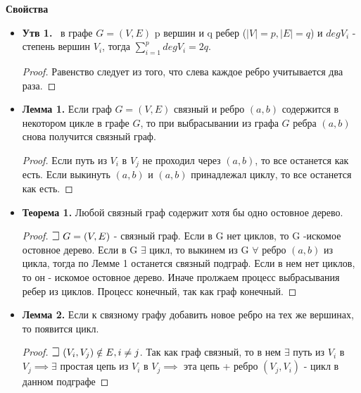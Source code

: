 \noindent\textbf{Свойства}
\begin{itemize}
\item \textbf{Утв 1.} 
\mathLet \ в графе $G = (V, E)$ p вершин и q ребер ($|V|=p, |E| = q$) и $deg V_i$ - степень вершин $V_i$, тогда
$\sum_{i = 1}^p degV_i = 2q$. \newline
\begin{proof}
Равенство следует из того, что слева каждое ребро учитывается два раза.
\end{proof}


\item \textbf{Лемма 1.} 
Если граф $G = (V, E)$ связный и ребро $(a, b)$ содержится в некотором цикле в графе $G$, то при выбрасывании из графа $G$ ребра $(a, b)$ снова получится связный граф.\newline
\begin{proof}
Если путь из $V_i$ в $V_j$ не проходил через $(a,b)$, то все останется как есть. Если выкинуть $(a,b)$ и $(a,b)$ принадлежал циклу, то все останется как есть.
\end{proof}


\item \textbf{Теорема 1.} 
Любой связный граф содержит хотя бы одно остовное дерево.\newline
\begin{proof}
$\mathLet ~ G=(V,E)$ - связный граф. Если в G нет циклов, то G -искомое остовное дерево. Если в G $\exists$ цикл, то выкинем из G $\forall$ ребро $(a,b)$ из цикла, тогда по Лемме 1 останется связный подграф. Если в нем нет циклов, то он - искомое остовное дерево. Иначе пролжаем процесс выбрасывания ребер из циклов. Процесс конечный, так как граф конечный.
\end{proof}

\item \textbf{Лемма 2.} 
Если к связному графу добавить новое ребро на тех же вершинах, то появится цикл. \newline
\begin{proof}
$\mathLet ~ (V_i, V_j) \notin E, i \neq j$. Так как граф связный, то в нем $\exists$ путь из $V_i$ в $V_j \implies \exists$ простая цепь из $V_i$ в $V_j \implies $ эта цепь + ребро $(V_j, V_i)$  - цикл в данном подграфе
\end{proof}


\end{itemize}
